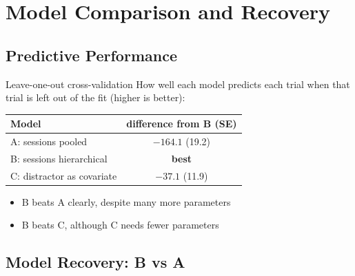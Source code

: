 \section{Model Comparison and Recovery}

\subsection{Predictive Performance}

\begin{frame}{Leave-one-out cross-validation}
  How well each model predicts each trial when that trial is left out of the fit
  (higher is better):
  \vspace{0.8em}

  \centering
  \begin{tabular}{lc}
    \toprule
    Model & difference from B (SE) \\
    \midrule
    A: sessions pooled          & $-164.1$ (19.2) \\
    B: sessions hierarchical    & \textbf{best} \\
    C: distractor as covariate  & $-37.1$ (11.9) \\
    \bottomrule
  \end{tabular}

  \vspace{0.8em}
  \raggedright
  \begin{itemize}
    \item B beats A clearly, despite many more parameters
    \item B beats C, although C needs fewer parameters
  \end{itemize}
\end{frame}

\subsection{Model Recovery: B vs A}

